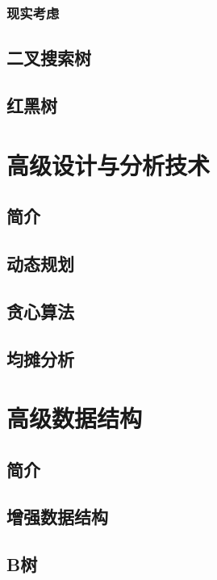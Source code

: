 \documentclass[lang=cn,newtx,10pt,scheme=chinese]{elegantbook}
\begin{document}
\section{现实考虑}\label{section-11.5}

\chapter{二叉搜索树}\label{chapter-12}

\chapter{红黑树}\label{chapter-13}

\part{高级设计与分析技术}

\chapter*{简介}

\chapter{动态规划}\label{chapter-14}

\chapter{贪心算法}\label{chapter-15}

\chapter{均摊分析}\label{chapter-16}

\part{高级数据结构}

\chapter*{简介}

\chapter{增强数据结构}\label{chapter-17}

\chapter{B树}\label{chapter-18}
\end{document}
